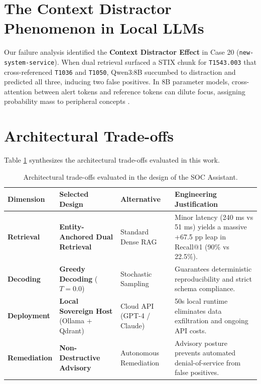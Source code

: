 \section{The Context Distractor Phenomenon in Local LLMs}
\label{sec:context_distractors}
Our failure analysis identified the \textbf{Context Distractor Effect} in Case 20 (\texttt{new-system-service}). When dual retrieval surfaced a STIX chunk for \texttt{T1543.003} that cross-referenced \texttt{T1036} and \texttt{T1050}, Qwen3:8B succumbed to distraction and predicted all three, inducing two false positives. In 8B parameter models, cross-attention between alert tokens and reference tokens can dilute focus, assigning probability mass to peripheral concepts \cite{vaswani2017attention}.

\section{Architectural Trade-offs}
\label{sec:architectural_tradeoffs}
Table \ref{tab:architectural_tradeoffs} synthesizes the architectural trade-offs evaluated in this work.

\begin{table}[!htbp]
\centering
\caption{Architectural trade-offs evaluated in the design of the SOC Assistant.}
\label{tab:architectural_tradeoffs}
\scriptsize
\begin{tabularx}{\textwidth}{@{}l p{3.2cm} p{3.2cm} X@{}}
\toprule
\textbf{Dimension} & \textbf{Selected Design} & \textbf{Alternative} & \textbf{Engineering Justification} \\
\midrule
\textbf{Retrieval} & \textbf{Entity-Anchored Dual Retrieval} & Standard Dense RAG & Minor latency (240 ms vs 51 ms) yields a massive +67.5 pp leap in Recall@1 (90\% vs 22.5\%). \\
\midrule
\textbf{Decoding} & \textbf{Greedy Decoding} ($T=0.0$) & Stochastic Sampling & Guarantees deterministic reproducibility and strict schema compliance. \\
\midrule
\textbf{Deployment} & \textbf{Local Sovereign Host} (Ollama + Qdrant) & Cloud API (GPT-4 / Claude) & 50s local runtime eliminates data exfiltration and ongoing API costs. \\
\midrule
\textbf{Remediation} & \textbf{Non-Destructive Advisory} & Autonomous Remediation & Advisory posture prevents automated denial-of-service from false positives. \\
\bottomrule
\end{tabularx}
\end{table}

